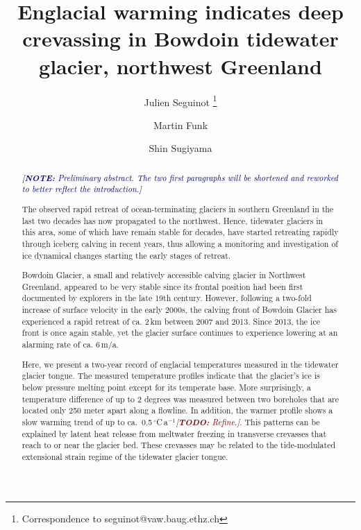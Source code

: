 \documentclass[utf8]{article}
\title{Englacial warming indicates deep crevassing in Bowdoin tidewater
       glacier, northwest Greenland}
\author[1]{Julien Seguinot
           \thanks{Correspondence to seguinot@vaw.baug.ethz.ch}}
\author[1]{Martin Funk}
\author[2]{Shin Sugiyama}
\affil[1]{Laboratory of Hydraulics, Hydrology and Glaciology,
          ETH Zürich, Switzerland}
\affil[2]{Institute of Low Temperature Science,
          Hokkaido University, Sapporo, Japan}
\newcommand{\note}[1]{\textcolor{darkblue}{\emph{[\textbf{NOTE:} #1]}}}
\newcommand{\todo}[1]{\textcolor{darkred}{\emph{[\textbf{TODO:} #1]}}}
\begin{document}

\maketitle

\begin{abstract}

    \note{Preliminary abstract. The two first paragraphs will be shortened and
          reworked to better reflect the introduction.}

    The observed rapid retreat of ocean-terminating glaciers in southern
    Greenland in the last two decades has now propagated to the northwest.
    Hence, tidewater glaciers in this area, some of which have remain stable
    for decades, have started retreating rapidly through iceberg calving in
    recent years, thus allowing a monitoring and investigation of ice dynamical
    changes starting the early stages of retreat.

    Bowdoin Glacier, a small and relatively accessible calving glacier in
    Northwest Greenland, appeared to be very stable since its frontal position
    had been first documented by explorers in the late 19th century. However,
    following a two-fold increase of surface velocity in the early 2000s, the
    calving front of Bowdoin Glacier has experienced a rapid retreat of ca.
    2\,km between 2007 and 2013. Since 2013, the ice front is once again
    stable, yet the glacier surface continues to experience lowering at an
    alarming rate of ca. 6\,m/a.

    Here, we present a two-year record of englacial temperatures measured in
    the tidewater glacier tongue. The measured temperature profiles indicate
    that the glacier's ice is below pressure melting point except for its
    temperate base. More surprisingly, a temperature difference of up to 2
    degrees was measured between two boreholes that are located only 250 meter
    apart along a flowline. In addition, the warmer profile shows a slow
    warming trend of up to ca.~0.5\,$^\circ$C\,a$^{-1}$\todo{Refine.}. This
    patterns can be explained by latent heat release from meltwater freezing in
    transverse crevasses that reach to or near the glacier bed. These crevasses
    may be related to the tide-modulated extensional strain regime of the
    tidewater glacier tongue.

\end{abstract}
\end{document}
